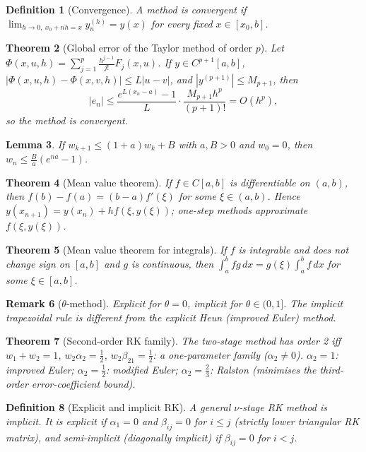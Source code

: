 \documentclass[10pt,a4paper]{article}
\theoremstyle{tight}
\newtheorem{theorem}{Theorem}[section]
\newtheorem{lemma}[theorem]{Lemma}
\newtheorem{definition}[theorem]{Definition}
\newtheorem{remark}[theorem]{Remark}
\begin{document}
\begin{definition}[Convergence]
A method is convergent if \(\lim_{h\to0,\ x_0+nh=x}y_n^{(h)}=y(x)\) for every fixed \(x\in[x_0,b]\).
\end{definition}

\begin{theorem}[Global error of the Taylor method of order \(p\)]
Let \(\Phi(x,u,h)=\sum_{j=1}^p\frac{h^{j-1}}{j!}F_j(x,u)\). If \(y\in C^{p+1}[a,b]\),
\(|\Phi(x,u,h)-\Phi(x,v,h)|\le L|u-v|\), and \(|y^{(p+1)}|\le M_{p+1}\), then
\[
  |e_n|\le\frac{e^{L(x_n-a)}-1}{L}\cdot\frac{M_{p+1}h^p}{(p+1)!}=O(h^p),
\]
so the method is convergent.
\end{theorem}

\begin{lemma}
If \(w_{k+1}\le(1+a)w_k+B\) with \(a,B>0\) and \(w_0=0\), then
\(w_n\le\frac Ba(e^{na}-1)\).
\end{lemma}

\begin{theorem}[Mean value theorem]
If \(f\in C[a,b]\) is differentiable on \((a,b)\), then \(f(b)-f(a)=(b-a)f'(\xi)\) for some \(\xi\in(a,b)\).
Hence \(y(x_{n+1})=y(x_n)+hf(\xi,y(\xi))\); one-step methods approximate \(f(\xi,y(\xi))\).
\end{theorem}

\begin{theorem}[Mean value theorem for integrals]
If \(f\) is integrable and does not change sign on \([a,b]\) and \(g\) is continuous, then
\(\int_a^bfg\,dx=g(\xi)\int_a^bf\,dx\) for some \(\xi\in[a,b]\).
\end{theorem}

\begin{remark}[\(\theta\)-method]
Explicit for \(\theta=0\), implicit for \(\theta\in(0,1]\). The implicit trapezoidal rule is
different from the explicit Heun (improved Euler) method.
\end{remark}

\begin{theorem}[Second-order RK family]
The two-stage method has order 2 iff \(w_1+w_2=1\), \(w_2\alpha_2=\frac12\),
\(w_2\beta_{21}=\frac12\): a one-parameter family (\(\alpha_2\ne0\)).
\(\alpha_2=1\): improved Euler; \(\alpha_2=\frac12\): modified Euler;
\(\alpha_2=\frac23\): Ralston (minimises the third-order error-coefficient bound).
\end{theorem}

\begin{definition}[Explicit and implicit RK]
A general \(\nu\)-stage RK method is implicit. It is explicit if \(\alpha_1=0\) and
\(\beta_{ij}=0\) for \(i\le j\) (strictly lower triangular RK matrix), and
semi-implicit (diagonally implicit) if \(\beta_{ij}=0\) for \(i<j\).
\end{definition}
\end{document}
